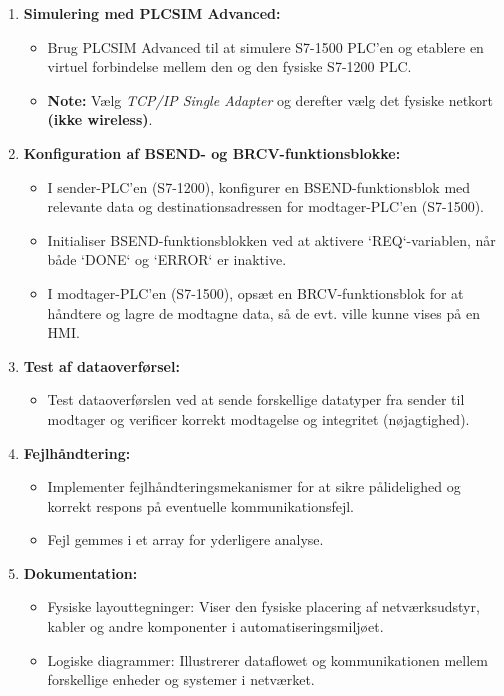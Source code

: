 \begin{enumerate}
\begin{itemize}
	\end{itemize}
	\item \textbf{Simulering med PLCSIM Advanced:}
	\begin{itemize}
		\item Brug PLCSIM Advanced til at simulere S7-1500 PLC'en og etablere en virtuel forbindelse mellem den og den fysiske S7-1200 PLC.
		\item \textbf{Note:} Vælg \textit{TCP/IP Single Adapter} og derefter vælg det fysiske netkort \textbf{(ikke wireless)}.
	\end{itemize}
	\item \textbf{Konfiguration af BSEND- og BRCV-funktionsblokke:}
	\begin{itemize}
		\item I sender-PLC'en (S7-1200), konfigurer en BSEND-funktionsblok med relevante data og destinationsadressen for modtager-PLC'en (S7-1500).
		\item Initialiser BSEND-funktionsblokken ved at aktivere `REQ`-variablen, når både `DONE` og `ERROR` er inaktive.
		\item I modtager-PLC'en (S7-1500), opsæt en BRCV-funktionsblok for at håndtere og lagre de modtagne data, så de evt. ville kunne vises på en HMI.
	\end{itemize}
	\item \textbf{Test af dataoverførsel:}
	\begin{itemize}
		\item Test dataoverførslen ved at sende forskellige datatyper fra sender til modtager og verificer korrekt modtagelse og integritet (nøjagtighed).
	\end{itemize}
	\item \textbf{Fejlhåndtering:}
	\begin{itemize}
		\item Implementer fejlhåndteringsmekanismer for at sikre pålidelighed og korrekt respons på eventuelle kommunikationsfejl.
		\item Fejl gemmes i et array for yderligere analyse.
	\end{itemize}
	\item \textbf{Dokumentation:}
	\begin{itemize}
		\item Fysiske layouttegninger: Viser den fysiske placering af netværksudstyr, kabler og andre komponenter i automatiseringsmiljøet.
		\item Logiske diagrammer: Illustrerer dataflowet og kommunikationen mellem forskellige enheder og systemer i netværket.

\end{itemize}
\end{enumerate}
